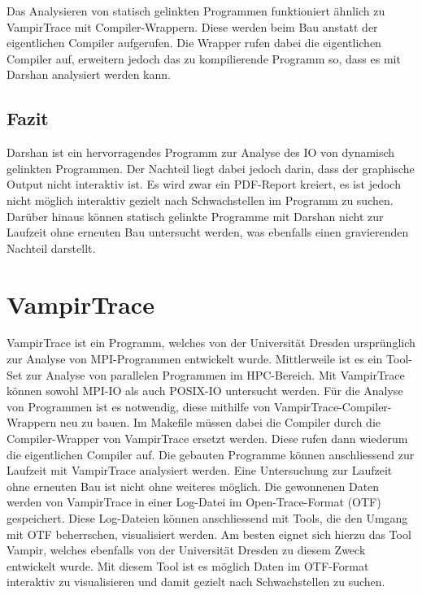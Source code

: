 Das Analysieren von statisch gelinkten Programmen funktioniert \"ahnlich zu VampirTrace mit Compiler-Wrappern. Diese werden beim Bau anstatt der eigentlichen Compiler aufgerufen. Die Wrapper rufen dabei die eigentlichen Compiler auf, erweitern jedoch das zu kompilierende Programm so, dass es mit Darshan analysiert werden kann. \cite{ArgonneNationalLaboratory.22.01.2019}\cite{ArgonneNationalLaboratory.19.01.2019}
\subsection{Fazit}
Darshan ist ein hervorragendes Programm zur Analyse des IO von dynamisch gelinkten Programmen. Der Nachteil liegt dabei jedoch darin, dass der graphische Output nicht interaktiv ist. Es wird zwar ein PDF-Report kreiert, es ist jedoch nicht m\"oglich interaktiv gezielt nach Schwachstellen im Programm zu suchen. Dar\"uber hinaus k\"onnen statisch gelinkte Programme mit Darshan nicht zur Laufzeit ohne erneuten Bau untersucht werden, was ebenfalls einen gravierenden Nachteil darstellt. 
\section{VampirTrace}
VampirTrace ist ein Programm, welches von der Universit\"at Dresden urspr\"unglich zur Analyse von MPI-Programmen entwickelt wurde. Mittlerweile ist es ein Tool-Set zur Analyse von parallelen Programmen im HPC-Bereich. Mit VampirTrace k\"onnen sowohl MPI-IO als auch POSIX-IO untersucht werden. F\"ur die Analyse von Programmen ist es notwendig, diese mithilfe von VampirTrace-Compiler-Wrappern neu zu bauen. Im Makefile m\"ussen dabei die Compiler durch die Compiler-Wrapper von VampirTrace ersetzt werden. Diese rufen dann wiederum die eigentlichen Compiler auf. Die gebauten Programme k\"onnen anschliessend zur Laufzeit mit VampirTrace analysiert werden. Eine Untersuchung zur Laufzeit ohne erneuten Bau ist nicht ohne weiteres m\"oglich.\newline\newline
Die gewonnenen Daten werden von VampirTrace in einer Log-Datei im Open-Trace-Format (OTF) gespeichert. Diese Log-Dateien k\"onnen anschliessend mit Tools, die den Umgang mit OTF beherrschen, visualisiert werden. Am besten eignet sich hierzu das Tool Vampir, welches ebenfalls von der Universit\"at Dresden zu diesem Zweck entwickelt wurde. Mit diesem Tool ist es m\"oglich Daten im OTF-Format interaktiv zu visualisieren und damit gezielt nach Schwachstellen zu suchen.
\cite{TUDresden.2016}\cite{Mendez.23.06.2016}
